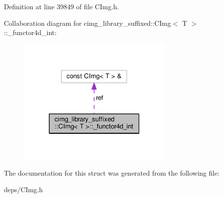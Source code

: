 Definition at line 39849 of file C\+Img.\+h.



Collaboration diagram for cimg\+\_\+library\+\_\+suffixed\+:\+:C\+Img$<$ T $>$\+:\+:\+\_\+functor4d\+\_\+int\+:
\nopagebreak
\begin{figure}[H]
\begin{center}
\leavevmode
\includegraphics[width=218pt]{d4/d81/structcimg__library__suffixed_1_1CImg_1_1__functor4d__int__coll__graph}
\end{center}
\end{figure}


The documentation for this struct was generated from the following file\+:\begin{DoxyCompactItemize}
\item 
deps/C\+Img.\+h\end{DoxyCompactItemize}
